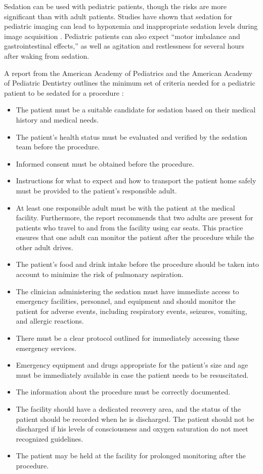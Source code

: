 Sedation can be used with pediatric patients, though the risks are more significant than with adult patients. Studies have shown that sedation for pediatric imaging can lead to hypoxemia and inappropriate sedation levels during image acquisition \cite{Malviya2000}. Pediatric patients can also expect ``motor imbalance and gastrointestinal effects,'' as well as agitation and restlessness for several hours after waking from sedation.

A report from the American Academy of Pediatrics and the American Academy of Pediatric Dentistry outlines the minimum set of criteria needed for a pediatric patient to be sedated for a procedure \cite{Cote2016}:
\begin{itemize}
\item The patient must be a suitable candidate for sedation based on their medical history and medical needs.
\item The patient's health status must be evaluated and verified by the sedation team before the procedure.
\item Informed consent must be obtained before the procedure.
\item Instructions for what to expect and how to transport the patient home safely must be provided to the patient's responsible adult.
\item At least one responsible adult must be with the patient at the medical facility. Furthermore, the report recommends that two adults are present for patients who travel to and from the facility using car seats. This practice ensures that one adult can monitor the patient after the procedure while the other adult drives.
\item The patient's food and drink intake before the procedure should be taken into account to minimize the risk of pulmonary aspiration.
\item The clinician administering the sedation must have immediate access to emergency facilities, personnel, and equipment and should monitor the patient for adverse events, including respiratory events, seizures, vomiting, and allergic reactions.
\item There must be a clear protocol outlined for immediately accessing these emergency services.
\item Emergency equipment and drugs appropriate for the patient's size and age must be immediately available in case the patient needs to be resuscitated.
\item The information about the procedure must be correctly documented.
\item The facility should have a dedicated recovery area, and the status of the patient should be recorded when he is discharged. The patient should not be discharged if his levels of consciousness and oxygen saturation do not meet recognized guidelines.
\item The patient may be held at the facility for prolonged monitoring after the procedure.
\end{itemize}
